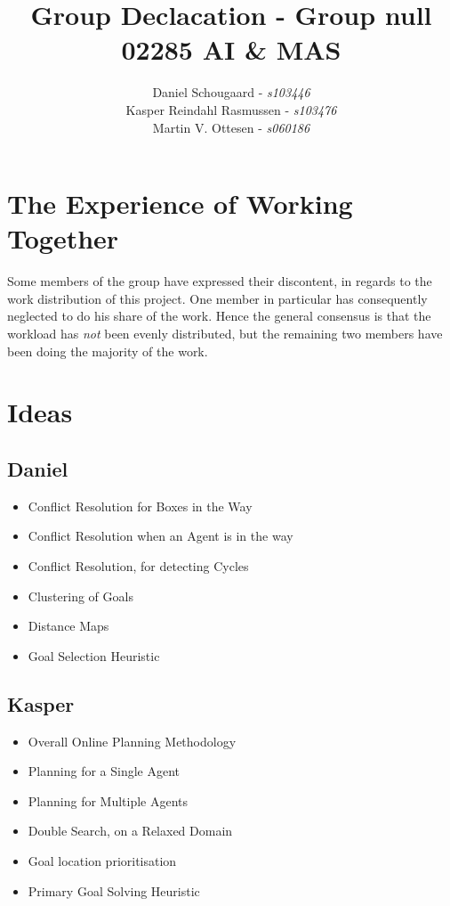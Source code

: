 \documentclass[10pt,a4paper]{article}
\title{Group Declacation - Group null\\ 02285 AI \& MAS}
\author{
	Daniel Schougaard - \textit{s103446} \\
 	Kasper Reindahl Rasmussen - \textit{s103476} \\
 	Martin V. Ottesen - \textit{s060186}
 }
\begin{document}
\clearpage\maketitle
\thispagestyle{empty}

\section*{The Experience of Working Together}
	Some members of the group have expressed their discontent, in regards to the work distribution of this project. One member in particular has consequently neglected to do his share of the work. Hence the general consensus is that the workload has \emph{not} been evenly distributed, but the remaining two members have been doing the majority of the work.
\pagebreak
\pagestyle{plain}

\section{Ideas}
	\subsection{Daniel}
		\begin{itemize}	
			\item Conflict Resolution for Boxes in the Way
			\item Conflict Resolution when an Agent is in the way
			\item Conflict Resolution, for detecting Cycles
			\item Clustering of Goals
			\item Distance Maps
			\item Goal Selection Heuristic
		\end{itemize}
	\subsection{Kasper}
		\begin{itemize}	
			\item Overall Online Planning Methodology
			\item Planning for a Single Agent
			\item Planning for Multiple Agents
			\item Double Search, on a Relaxed Domain
			\item Goal location prioritisation
			\item Primary Goal Solving Heuristic
		\end{itemize}
\end{document}

